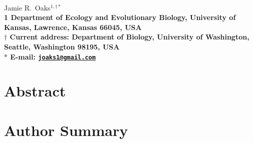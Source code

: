 \documentclass[10pt]{article}
\date{}
\begin{document}
\begin{flushleft}
{\Large
\textbf{\dppTitle}
}
\\
Jamie R.\ Oaks$^{1,\dagger\ast}$
\\
\bf{1} Department of Ecology and Evolutionary Biology, University of Kansas, Lawrence, Kansas 66045, USA
\\
$\dagger$ Current address: Department of Biology, University of Washington, Seattle, Washington 98195, USA
\\
$\ast$ E-mail: \href{mailto:joaks1@gmail.com}{\texttt{joaks1@gmail.com}}
\end{flushleft}

\section*{Abstract}


\section*{Author Summary}






\end{document}
